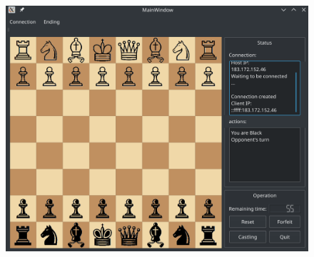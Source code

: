 \documentclass[a4paper,10pt]{article}
\begin{document}
\begin{enumerate}
\begin{figure}[htbp]
{                                                        \begin{minipage}{1\textwidth}
                                                                \centering
                                                                \includegraphics[width=.5\textwidth]{play.png}
                                                        \end{minipage}
                                                }
                                        \end{figure}
                        \end{enumerate}
\end{document}
